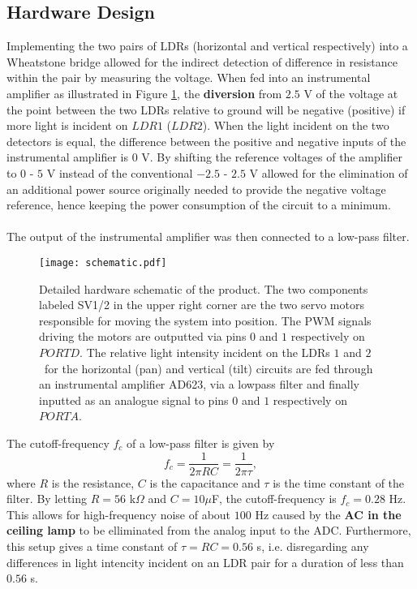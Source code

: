 \documentclass[journal]{Imperial_lab_report}
\begin{document}
\subsection{Hardware Design}
Implementing the two pairs of LDRs (horizontal and vertical respectively) into a Wheatstone bridge allowed for the indirect detection of difference in resistance within the pair by measuring the voltage. When fed into an instrumental amplifier as illustrated in Figure \ref{schematic}, the \textbf{diversion} from $2.5$ V of the voltage at the point between the two LDRs relative to ground will be negative (positive) if more light is incident on $LDR1$ ($LDR2$). When the light incident on the two detectors is equal, the difference between the positive and negative inputs of the instrumental amplifier is $0$ V. By shifting the reference voltages of the amplifier to $0$ - $5$ V instead of the conventional $-2.5$ - $2.5$ V allowed for the elimination of an additional power source originally needed to provide the negative voltage reference, hence keeping the power consumption of the circuit to a minimum. 
\\
\\The output of the instrumental amplifier was then connected to a low-pass filter. 

\begin{figure*}[!t]
	\centering
	\texttt{[image: schematic.pdf]}
	\caption{Detailed hardware schematic of the product. The two components labeled SV1/2 in the upper right corner are the two servo motors responsible for moving the system into position. The PWM signals driving the motors are outputted via pins $0$ and $1$ respectively on $PORTD$. The relative light intensity incident on the LDRs $1$ and $2$ for the horizontal (pan) and vertical (tilt) circuits are fed through an instrumental amplifier AD623, via a lowpass filter and finally inputted as an analogue signal to pins $0$ and $1$ respectively on $PORTA$.}
	\label{schematic}
\end{figure*}

The cutoff-frequency $f_{c}$ of a low-pass filter is given by
\begin{equation}
	f_{c} = \frac{1}{2 \pi RC} = \frac{1}{2 \pi \tau} ,
\end{equation}
where $R$ is the resistance, $C$ is the capacitance and $\tau$ is the time constant of the filter. By letting $R=56$ k$\Omega$ and $C=10 \mu$F, the cutoff-frequency is $f_{c} = 0.28 $ Hz. This allows for high-frequency noise of about $100$ Hz caused by the \textbf{AC in the ceiling lamp} to be elliminated from the analog input to the ADC. Furthermore, this setup gives a time constant of $\tau = RC = 0.56$ s, i.e. disregarding any differences in light intencity incident on an LDR pair for a duration of less than $0.56$ s. 
\end{document}
